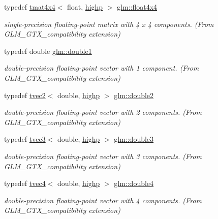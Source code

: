 \begin{DoxyCompactItemize}
typedef \mbox{\hyperlink{structglm_1_1tmat4x4}{tmat4x4}}$<$ float, \mbox{\hyperlink{namespaceglm_a0f04f086094c747d227af4425893f545ac6f7eab42eacbb10d59a58e95e362074}{highp}} $>$ \mbox{\hyperlink{group__gtx__compatibility_ga67688a2f2fc6386544d1a47a5d430467}{glm\+::float4x4}}
\begin{DoxyCompactList}\small\item\em single-\/precision floating-\/point matrix with 4 x 4 components. (From G\+L\+M\+\_\+\+G\+T\+X\+\_\+compatibility extension) \end{DoxyCompactList}\item 
typedef double \mbox{\hyperlink{group__gtx__compatibility_gab8b88350212cea916857cb2f49b8a29f}{glm\+::double1}}
\begin{DoxyCompactList}\small\item\em double-\/precision floating-\/point vector with 1 component. (From G\+L\+M\+\_\+\+G\+T\+X\+\_\+compatibility extension) \end{DoxyCompactList}\item 
typedef \mbox{\hyperlink{structglm_1_1tvec2}{tvec2}}$<$ double, \mbox{\hyperlink{namespaceglm_a0f04f086094c747d227af4425893f545ac6f7eab42eacbb10d59a58e95e362074}{highp}} $>$ \mbox{\hyperlink{group__gtx__compatibility_ga490652005dad57a41887b974195f36c1}{glm\+::double2}}
\begin{DoxyCompactList}\small\item\em double-\/precision floating-\/point vector with 2 components. (From G\+L\+M\+\_\+\+G\+T\+X\+\_\+compatibility extension) \end{DoxyCompactList}\item 
typedef \mbox{\hyperlink{structglm_1_1tvec3}{tvec3}}$<$ double, \mbox{\hyperlink{namespaceglm_a0f04f086094c747d227af4425893f545ac6f7eab42eacbb10d59a58e95e362074}{highp}} $>$ \mbox{\hyperlink{group__gtx__compatibility_ga80c4961ce61e918f21c1546d43aea2f0}{glm\+::double3}}
\begin{DoxyCompactList}\small\item\em double-\/precision floating-\/point vector with 3 components. (From G\+L\+M\+\_\+\+G\+T\+X\+\_\+compatibility extension) \end{DoxyCompactList}\item 
typedef \mbox{\hyperlink{structglm_1_1tvec4}{tvec4}}$<$ double, \mbox{\hyperlink{namespaceglm_a0f04f086094c747d227af4425893f545ac6f7eab42eacbb10d59a58e95e362074}{highp}} $>$ \mbox{\hyperlink{group__gtx__compatibility_ga43d433fc74b24a45801e2be74e7f6fca}{glm\+::double4}}
\begin{DoxyCompactList}\small\item\em double-\/precision floating-\/point vector with 4 components. (From G\+L\+M\+\_\+\+G\+T\+X\+\_\+compatibility extension) \end{DoxyCompactList}\item 

\end{DoxyCompactItemize}
